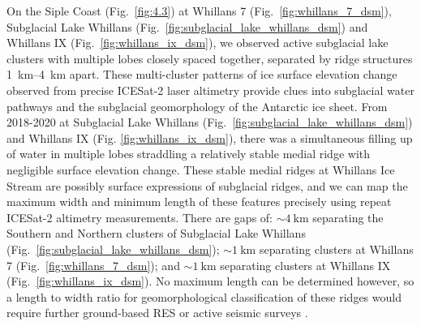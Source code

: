 On the Siple Coast (Fig.~\ref{fig:4.3}) at Whillans 7 (Fig.~\ref{fig:whillans_7_dsm}), Subglacial Lake Whillans (Fig.~\ref{fig:subglacial_lake_whillans_dsm}) and Whillans IX (Fig.~\ref{fig:whillans_ix_dsm}), we observed active subglacial lake clusters with multiple lobes closely spaced together, separated by ridge structures \SIrange{1}{4}{\kilo\metre} apart.
These multi-cluster patterns of ice surface elevation change observed from precise ICESat-2 laser altimetry provide clues into subglacial water pathways and the subglacial geomorphology of the Antarctic ice sheet.
From 2018-2020 at Subglacial Lake Whillans (Fig.~\ref{fig:subglacial_lake_whillans_dsm}) and Whillans IX (Fig. \ref{fig:whillans_ix_dsm}), there was a simultaneous filling up of water in multiple lobes straddling a relatively stable medial ridge with negligible surface elevation change.
These stable medial ridges at Whillans Ice Stream are possibly surface expressions of subglacial ridges, and we can map the maximum width and minimum length of these features precisely using repeat ICESat-2 altimetry measurements.
There are gaps of: $\sim\SI{4}{\kilo\metre}$ separating the Southern and Northern clusters of Subglacial Lake Whillans (Fig.~\ref{fig:subglacial_lake_whillans_dsm}); $\sim\SI{1}{\kilo\metre}$ separating clusters at Whillans 7 (Fig.~\ref{fig:whillans_7_dsm}); and $\sim\SI{1}{\kilo\metre}$ separating clusters at Whillans IX (Fig.~\ref{fig:whillans_ix_dsm}).
No maximum length can be determined however, so a length to width ratio for geomorphological classification of these ridges \citep{Elysubglacialbedformscomprise2016} would require further ground-based \gls{RES} or active seismic surveys \citep[e.g.][]{ChristiansonSubglacialLakeWhillans2012,HorganSubglacialLakeWhillans2012}.

